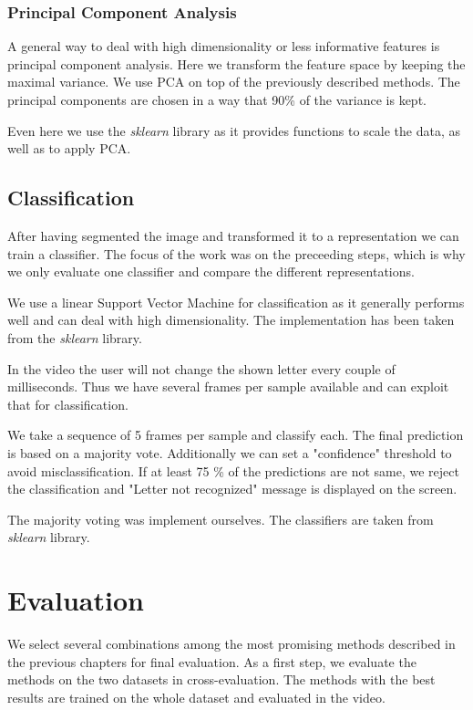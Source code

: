 \documentclass[letterpaper, 10 pt, conference]{ieeeconf}  %
\begin{document}
\subsubsection{Principal Component Analysis}

A general way to deal with high dimensionality or less informative features is principal component analysis. Here we transform the feature space by keeping the maximal variance. We use PCA on top of the previously described methods. The principal components are chosen in a way that 90\% of the variance is kept.

Even here we use the \textit{sklearn} library as it provides functions to scale the data, as well as to apply PCA.

\subsection{Classification}

After having segmented the image and transformed it to a representation we can train a classifier. The focus of the work was on the preceeding steps, which is why we only evaluate one classifier and compare the different representations.

We use a linear Support Vector Machine for classification as it generally performs well and can deal with high dimensionality. The implementation has been taken from the \textit{sklearn} library.

In the video the user will not change the shown letter every couple of milliseconds. Thus we have several frames per sample available and can exploit that for classification. 

We take a sequence of 5 frames per sample and classify each. The final prediction is based on a majority vote. Additionally we can set a "confidence" threshold to avoid misclassification. If at least 75 \% of the predictions are not same, we reject the classification and "Letter not recognized" message is displayed on the screen.

The majority voting was implement ourselves. The classifiers are taken from \textit{sklearn} library.

\section{Evaluation}
\label{sec:eval}
We select several combinations among the most promising methods described in the previous chapters for final evaluation. As a first step, we evaluate the methods on the two datasets in cross-evaluation. The methods with the best results are trained on the whole dataset and evaluated in the video.
\end{document}
